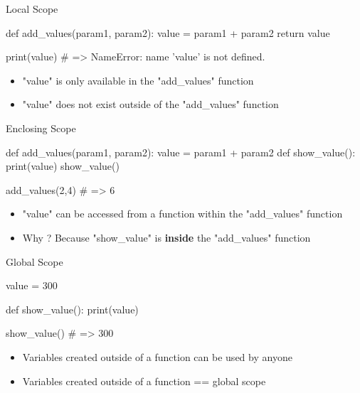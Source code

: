 \documentclass[serif, aspectratio=169]{beamer}
\begin{document}
\begin{frame}[fragile]{Local Scope}
    \begin{pythoncode}
    def add_values(param1, param2):
        value = param1 + param2
        return value

    print(value) # => NameError: name 'value' is not defined.
    \end{pythoncode}
    \begin{block}{}
        \begin{itemize}
            \item "value" is only available in the "add\_values" function
            \item "value" does not exist outside of the "add\_values" function
        \end{itemize}
    \end{block}
\end{frame}

\begin{frame}[fragile]{Enclosing Scope}
    \begin{pythoncode}
    def add_values(param1, param2):
        value = param1 + param2
        def show_value():
            print(value)
        show_value()

    add_values(2,4) # => 6
    \end{pythoncode}
    \begin{block}{}
        \begin{itemize}
            \item "value" can be accessed from a function within the "add\_values" function
            \item Why ? Because "show\_value" is \textbf{inside} the "add\_values" function
        \end{itemize}
    \end{block}
\end{frame}

\begin{frame}[fragile]{Global Scope}
    \begin{pythoncode}
    value = 300

    def show_value():
        print(value)

    show_value() # => 300
    \end{pythoncode}
    \begin{block}{}
        \begin{itemize}
            \item Variables created outside of a function can be used by anyone
            \item Variables created outside of a function == global scope
        \end{itemize}
    \end{block}
\end{frame}
\end{document}
